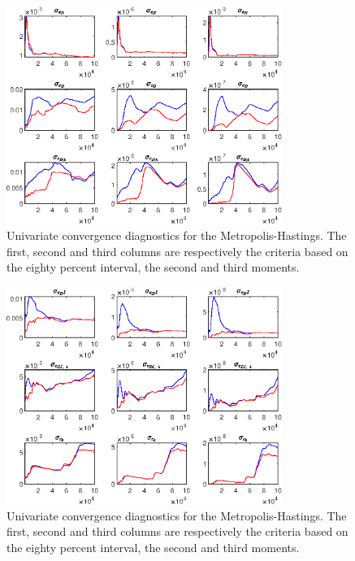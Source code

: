 \begin{figure}[H]
\centering 
\includegraphics[width=0.80\textwidth]{BRS_sectoral/Output/BRS_sectoral_udiag3}
\caption{Univariate convergence diagnostics for the Metropolis-Hastings.
The first, second and third columns are respectively the criteria based on
the eighty percent interval, the second and third moments.}\label{Fig:UnivariateDiagnostics:3}
\end{figure}

\begin{figure}[H]
\centering 
\includegraphics[width=0.80\textwidth]{BRS_sectoral/Output/BRS_sectoral_udiag4}
\caption{Univariate convergence diagnostics for the Metropolis-Hastings.
The first, second and third columns are respectively the criteria based on
the eighty percent interval, the second and third moments.}\label{Fig:UnivariateDiagnostics:4}
\end{figure}

